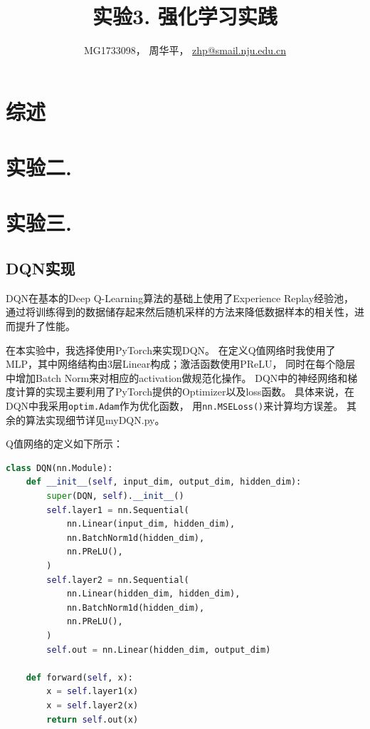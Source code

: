 \documentclass[a4paper,UTF8]{article}
\theoremstyle{definition}
\begin{document}
\title{实验3. 强化学习实践}
\author{MG1733098， 周华平， \url{zhp@smail.nju.edu.cn}}
\maketitle

\section*{综述}



\section*{实验二.}


\section*{实验三.}

\subsection*{DQN实现}

DQN在基本的Deep Q-Learning算法的基础上使用了Experience Replay经验池，
通过将训练得到的数据储存起来然后随机采样的方法来降低数据样本的相关性，进而提升了性能。

在本实验中，我选择使用PyTorch来实现DQN。
在定义Q值网络时我使用了MLP，其中网络结构由3层Linear构成；激活函数使用PReLU，
同时在每个隐层中增加Batch Norm来对相应的activation做规范化操作。
DQN中的神经网络和梯度计算的实现主要利用了PyTorch提供的Optimizer以及loss函数。
具体来说，在DQN中我采用\lstinline[language=Python]{optim.Adam}作为优化函数，
用\lstinline[language=Python]{nn.MSELoss()}来计算均方误差。
其余的算法实现细节详见myDQN.py。

Q值网络的定义如下所示：

\begin{lstlisting}[language=Python]
class DQN(nn.Module):
    def __init__(self, input_dim, output_dim, hidden_dim):
        super(DQN, self).__init__()
        self.layer1 = nn.Sequential(
            nn.Linear(input_dim, hidden_dim),
            nn.BatchNorm1d(hidden_dim),
            nn.PReLU(),
        )
        self.layer2 = nn.Sequential(
            nn.Linear(hidden_dim, hidden_dim),
            nn.BatchNorm1d(hidden_dim),
            nn.PReLU(),
        )
        self.out = nn.Linear(hidden_dim, output_dim)

    def forward(self, x):
        x = self.layer1(x)
        x = self.layer2(x)
        return self.out(x)
\end{lstlisting}
\end{document}
